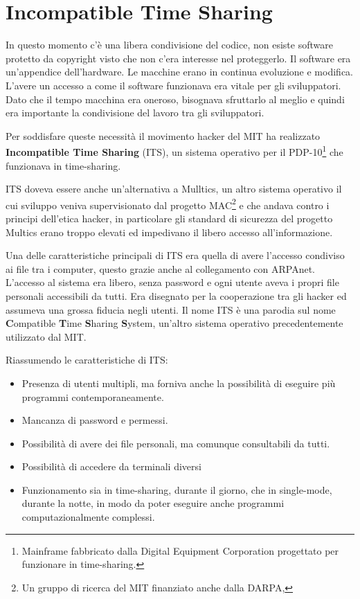 \section{Incompatible Time Sharing}

In questo momento c'è una libera condivisione del codice, non esiste software protetto da copyright visto che non c'era interesse nel proteggerlo. 
Il software era un'appendice dell'hardware. Le macchine erano in continua evoluzione e modifica. 
L'avere un accesso a come il software funzionava era vitale per gli sviluppatori. 
Dato che il tempo macchina era oneroso, bisognava sfruttarlo al meglio e quindi era importante la condivisione del lavoro tra gli sviluppatori.

Per soddisfare queste necessità il movimento hacker del MIT ha realizzato \textbf{Incompatible Time Sharing} (ITS), un sistema operativo per il PDP-10\footnote{Mainframe fabbricato dalla Digital Equipment Corporation progettato per funzionare in time-sharing.} che funzionava in time-sharing.

ITS doveva essere anche un'alternativa a Mulltics, un altro sistema operativo il cui sviluppo veniva supervisionato dal progetto MAC\footnote{Un gruppo di ricerca del MIT finanziato anche dalla DARPA,} e che andava contro i principi dell'etica hacker, in particolare gli standard di sicurezza del progetto Multics erano troppo elevati ed impedivano il libero accesso all'informazione.

Una delle caratteristiche principali di ITS era quella di avere l'accesso condiviso ai file tra i computer, questo grazie anche al collegamento con ARPAnet. 
L'accesso al sistema era libero, senza password e ogni utente aveva i propri file personali accessibili da tutti. 
Era disegnato per la cooperazione tra gli hacker ed assumeva una grossa fiducia negli utenti.
Il nome ITS è una parodia sul nome \textbf{C}ompatible \textbf{T}ime \textbf{S}haring \textbf{S}ystem, un'altro sistema operativo precedentemente utilizzato dal MIT.

Riassumendo le caratteristiche di ITS:

\begin{itemize}
	\item Presenza di utenti multipli, ma forniva anche la possibilità di eseguire più programmi contemporaneamente.
	\item Mancanza di password e permessi.
	\item Possibilità di avere dei file personali, ma comunque consultabili da tutti.
	\item Possibilità di accedere da terminali diversi
	\item Funzionamento sia in time-sharing, durante il giorno, che in single-mode, durante la notte, in modo da poter eseguire anche programmi computazionalmente complessi.
\end{itemize}

